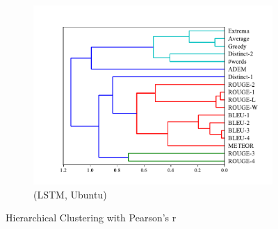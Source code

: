 \begin{figure}[htb]
\begin{subfigure}{0.33\linewidth}
        \includegraphics[width=\linewidth]{figure/plot/hierarchy/v2/pearson/lstm/ubuntu/plot.pdf}
        \caption{(LSTM, Ubuntu)}
    \end{subfigure}
    \caption{Hierarchical Clustering with Pearson's r}
    \label{fig:hierarchy}
\end{figure}
